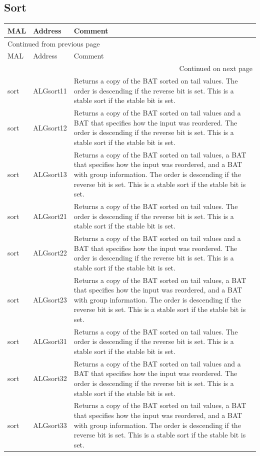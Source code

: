 \documentclass[11pt]{article}
\begin{document}
\subsection{Sort}
\label{sec:org4b4c3d0}
\begin{longtable}{|l|l|p{10cm}|}
\hline
MAL & Address & Comment\\
\hline
\endfirsthead
\multicolumn{3}{l}{Continued from previous page} \\
\hline

MAL & Address & Comment \\

\hline
\endhead
\hline\multicolumn{3}{r}{Continued on next page} \\
\endfoot
\endlastfoot
\hline
sort & ALGsort11 & Returns a copy of the BAT sorted on tail values. The order is descending if the reverse bit is set. This is a stable sort if the stable bit is set.\\
\hline
sort & ALGsort12 & Returns a copy of the BAT sorted on tail values and a BAT that specifies how the input was reordered. The order is descending if the reverse bit is set. This is a stable sort if the stable bit is set.\\
\hline
sort & ALGsort13 & Returns a copy of the BAT sorted on tail values, a BAT that specifies how the input was reordered, and a BAT with group information. The order is descending if the reverse bit is set. This is a stable sort if the stable bit is set.\\
\hline
sort & ALGsort21 & Returns a copy of the BAT sorted on tail values. The order is descending if the reverse bit is set. This is a stable sort if the stable bit is set.\\
\hline
sort & ALGsort22 & Returns a copy of the BAT sorted on tail values and a BAT that specifies how the input was reordered. The order is descending if the reverse bit is set. This is a stable sort if the stable bit is set.\\
\hline
sort & ALGsort23 & Returns a copy of the BAT sorted on tail values, a BAT that specifies how the input was reordered, and a BAT with group information. The order is descending if the reverse bit is set. This is a stable sort if the stable bit is set.\\
\hline
sort & ALGsort31 & Returns a copy of the BAT sorted on tail values. The order is descending if the reverse bit is set. This is a stable sort if the stable bit is set.\\
\hline
sort & ALGsort32 & Returns a copy of the BAT sorted on tail values and a BAT that specifies how the input was reordered. The order is descending if the reverse bit is set. This is a stable sort if the stable bit is set.\\
\hline
sort & ALGsort33 & Returns a copy of the BAT sorted on tail values, a BAT that specifies how the input was reordered, and a BAT with group information. The order is descending if the reverse bit is set. This is a stable sort if the stable bit is set.\\
\hline
\end{longtable}
\end{document}
